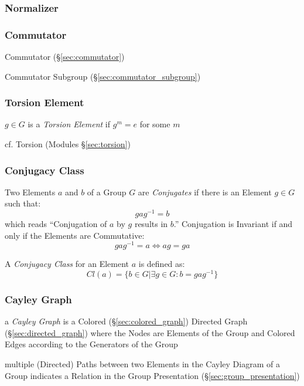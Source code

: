 \subsubsection{Normalizer}\label{sec:group_normalizer}

\subsubsection{Commutator}\label{sec:group_commutator}

Commutator (\S\ref{sec:commutator})

Commutator Subgroup (\S\ref{sec:commutator_subgroup})



\subsubsection{Torsion Element}\label{sec:torsion_element}

$g \in G$ is a \emph{Torsion Element} if $g^m = e$ for some $m$

cf. Torsion (Modules \S\ref{sec:torsion})



\subsubsection{Conjugacy Class}\label{sec:conjugacy_class}

Two Elements $a$ and $b$ of a Group $G$ are \emph{Conjugates} if there is an
Element $g \in G$ such that:
\[
    gag^{-1} = b
\]
which reads ``Conjugation of $a$ by $g$ results in $b$.'' Conjugation is
Invariant if and only if the Elements are Commutative:
\[
    gag^{-1} = a \Leftrightarrow ag = ga
\]

A \emph{Conjugacy Class} for an Element $a$ is defined as:
\[
    Cl(a) = \{ b \in G | \exists g \in G : b = gag^{-1}\}
\]



\subsubsection{Cayley Graph}\label{sec:cayley_graph}

a \emph{Cayley Graph} is a Colored (\S\ref{sec:colored_graph}) Directed Graph
(\S\ref{sec:directed_graph}) where the Nodes are Elements of the Group and
Colored Edges according to the Generators of the Group

multiple (Directed) Paths between two Elements in the Cayley Diagram of a Group
indicates a Relation in the Group Presentation (\S\ref{sec:group_presentation})

